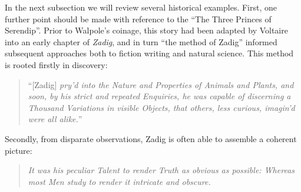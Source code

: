 In the next subsection we will review several historical examples.
First, one further point should be made with reference to the ``The
Three Princes of Serendip''.  Prior to Walpole's coinage, this story
had been adapted by Voltaire into an early chapter of \emph{Zadig},
and in turn ``the method of Zadig'' informed subsequent approaches
both to fiction writing and natural science.  This method is rooted
firstly in discovery:

\begin{quote}
``[Zadig] \emph{pry’d into the Nature and Properties of Animals and
    Plants, and soon, by his strict and repeated Enquiries, he was
    capable of discerning a Thousand Variations in visible Objects,
    that others, less curious, imagin’d were all
    alike.}''~\cite[pp. 21--22]{zadig}
\end{quote}

\noindent Secondly, from disparate observations, Zadig is often able
to assemble a coherent picture:
\begin{quote}
\emph{It was his peculiar Talent to render Truth as obvious as
  possible: Whereas most Men study to render it intricate and
  obscure.}~\cite[p. 54]{zadig}
\end{quote}





